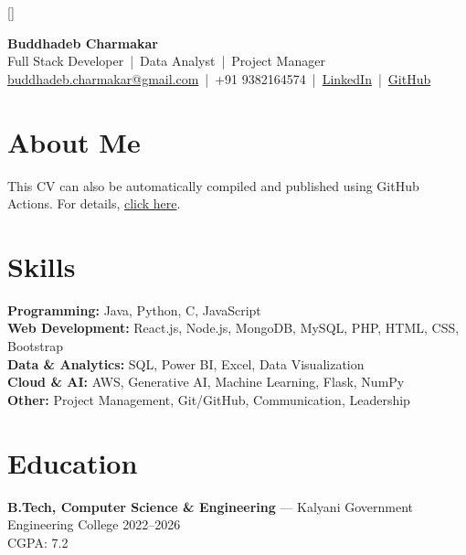 \hypersetup{colorlinks=true,urlcolor=darkblue}

\titleformat{\section}{
  \large\bfseries\color{darkblue}
}{}{0em}{}[\titlerule]



\begin{center}
    {\Huge \textbf{Buddhadeb Charmakar}} \\[6pt]
    Full Stack Developer \,|\, Data Analyst \,|\, Project Manager \\[4pt]
    \href{mailto:buddhadeb.charmakar@gmail.com}{buddhadeb.charmakar@gmail.com} \,|\, 
    +91 9382164574 \,|\, 
    \href{https://www.linkedin.com/in/buddhadeb-charmakar}{LinkedIn} \,|\, 
    \href{https://github.com/Buddhadeb-kgec}{GitHub}
\end{center}

\section*{About Me}
This CV can also be automatically compiled and published using GitHub Actions. For details, \href{https://github.com/jitinnair1/autoCV}{click here}.

\section*{Skills}
\textbf{Programming:} Java, Python, C, JavaScript \\
\textbf{Web Development:} React.js, Node.js, MongoDB, MySQL, PHP, HTML, CSS, Bootstrap \\
\textbf{Data \& Analytics:} SQL, Power BI, Excel, Data Visualization \\
\textbf{Cloud \& AI:} AWS, Generative AI, Machine Learning, Flask, NumPy \\
\textbf{Other:} Project Management, Git/GitHub, Communication, Leadership

\section*{Education}
\textbf{B.Tech, Computer Science \& Engineering} — Kalyani Government Engineering College \hfill 2022–2026 \\
CGPA: 7.2  

